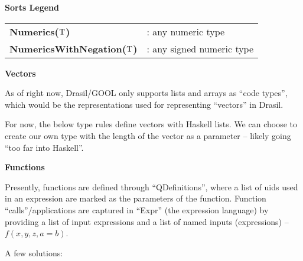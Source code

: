 \begin{center}
    \textbf{Sorts Legend}
    \begin{tabular}{ l l }
        \textbf{Numerics($\mathrm{T}$)} &: any numeric type \\
        \textbf{NumericsWithNegation($\mathrm{T}$)} &: any signed numeric type
    \end{tabular}
    
\end{center}

\textbf{Vectors}

As of right now, Drasil/GOOL only supports lists and arrays as ``code types'', 
which would be the representations used for representing ``vectors'' in Drasil.


For now, the below type rules define vectors with Haskell lists. We can choose to
create our own type with the length of the vector as a parameter -- likely going
``too far into Haskell''.

\textbf{Functions}

Presently, functions are defined through ``QDefinitions'', where a list of
\acs{uid}s used in an expression are marked as the parameters of the function. Function
``calls''/applications are captured in ``Expr'' (the expression language) by
providing a list of input expressions and a list of named inputs (expressions) -- 
$f(x,y,z,a=b)$.



A few solutions:

